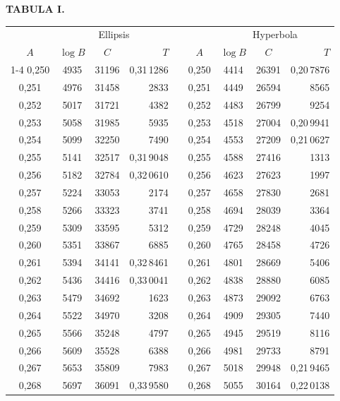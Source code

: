 \endgroup
\clearpage
{}
\begingroup
\centering
\fontsize{9}{9}\selectfont
\setlength{\tabcolsep}{6pt}
\renewcommand{\arraystretch}{1}
\setlength{\parskip}{0pt}
\textbf{TABULA I.}
\par\vspace{7pt}
\begin{tabular}{|c|c|c|r|@{}p{9pt}@{}|c|c|c|r|}
\hline
 & \multicolumn{3}{c|}{Ellipsis} & & & \multicolumn{3}{c|}{Hyperbola} \\
\(A\) & \(\log B\) & \(C\) & \(T\) & & \(A\) & \(\log B\) & \(C\) & \(T\) \\
\cline{1-4}\cline{6-9}
0,250 & 4935 & 31196 & 0,31\,1286 &  & 0,250 & 4414 & 26391 & 0,20\,7876 \\
0,251 & 4976 & 31458 & 2833 &  & 0,251 & 4449 & 26594 & 8565 \\
0,252 & 5017 & 31721 & 4382 &  & 0,252 & 4483 & 26799 & 9254 \\
0,253 & 5058 & 31985 & 5935 &  & 0,253 & 4518 & 27004 & 0,20\,9941 \\
0,254 & 5099 & 32250 & 7490 &  & 0,254 & 4553 & 27209 & 0,21\,0627 \\
0,255 & 5141 & 32517 & 0,31\,9048 &  & 0,255 & 4588 & 27416 & 1313 \\[3pt]
0,256 & 5182 & 32784 & 0,32\,0610 &  & 0,256 & 4623 & 27623 & 1997 \\
0,257 & 5224 & 33053 & 2174 &  & 0,257 & 4658 & 27830 & 2681 \\
0,258 & 5266 & 33323 & 3741 &  & 0,258 & 4694 & 28039 & 3364 \\
0,259 & 5309 & 33595 & 5312 &  & 0,259 & 4729 & 28248 & 4045 \\
0,260 & 5351 & 33867 & 6885 &  & 0,260 & 4765 & 28458 & 4726 \\[3pt]
0,261 & 5394 & 34141 & 0,32\,8461 &  & 0,261 & 4801 & 28669 & 5406 \\
0,262 & 5436 & 34416 & 0,33\,0041 &  & 0,262 & 4838 & 28880 & 6085 \\
0,263 & 5479 & 34692 & 1623 &  & 0,263 & 4873 & 29092 & 6763 \\
0,264 & 5522 & 34970 & 3208 &  & 0,264 & 4909 & 29305 & 7440 \\
0,265 & 5566 & 35248 & 4797 &  & 0,265 & 4945 & 29519 & 8116 \\[3pt]
0,266 & 5609 & 35528 & 6388 &  & 0,266 & 4981 & 29733 & 8791 \\
0,267 & 5653 & 35809 & 7983 &  & 0,267 & 5018 & 29948 & 0,21\,9465 \\
0,268 & 5697 & 36091 & 0,33\,9580 &  & 0,268 & 5055 & 30164 & 0,22\,0138 \\

\end{tabular}
